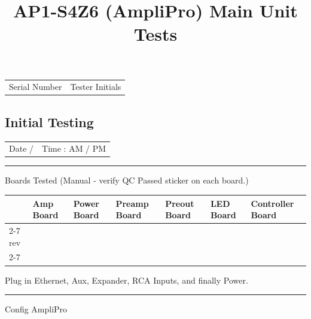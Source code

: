 \documentclass[12pt]{article}
\title{AP1-S4Z6 (AmpliPro) Main Unit Tests}
\author{} %
\begin{document}
\maketitle\thispagestyle{empty}

\begin{tabularx}{\textwidth}{XX}
  Serial Number \hrulefill & Tester Initials \hrulefill
\end{tabularx}

\subsection*{Initial Testing}

\begin{tabularx}{\textwidth}{XX}
  \\ %
  Date \hrulefill\hspace{0.2em} / \hrulefill &
    Time \hrulefill\hspace{0.2em} : \hrulefill AM / PM
\end{tabularx}

\rule{4em}{0.4pt} Boards Tested (Manual - verify QC Passed sticker on each board.)

{\renewcommand{\arraystretch}{2}
\begin{tabularx}{\textwidth}{lXXXXXX}
  & \textbf{Amp Board} & \textbf{Power Board} & \textbf{Preamp Board} &
    \textbf{Preout Board} & \textbf{LED Board} & \textbf{Controller Board} \\
  \cline{2-7}
  rev & \multicolumn{1}{|c|}{} & \multicolumn{1}{|c|}{} & \multicolumn{1}{|c|}{}
    & \multicolumn{1}{|c|}{} & \multicolumn{1}{|c|}{} & \multicolumn{1}{|c|}{} \\[1.5ex]
  \cline{2-7}
\end{tabularx}}

Plug in Ethernet, Aux, Expander, RCA Inputs, and finally Power.

\rule{4em}{0.4pt} Config AmpliPro




\end{document}
